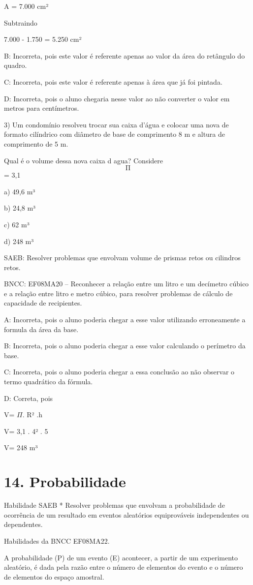 A = 7.000 cm²

Subtraindo

7.000 - 1.750 = 5.250 cm²

B: Incorreta, pois este valor é referente apenas ao valor da área do
retângulo do quadro.

C: Incorreta, pois este valor é referente apenas à área que já foi
pintada.

D: Incorreta, pois o aluno chegaria nesse valor ao não converter o valor
em metros para centímetros.

3) Um condomínio resolveu trocar sua caixa d'água e colocar uma nova de
formato cilíndrico com diâmetro de base de comprimento 8 m e altura de
comprimento de 5 m.

Qual é o volume dessa nova caixa d agua? Considere \[\text{Π}\] = 3,1

a) 49,6 m³

b) 24,8 m³

c) 62 m³

d) 248 m³

SAEB: Resolver problemas que envolvam volume de prismas retos ou
cilindros retos.

BNCC: EF08MA20 -- Reconhecer a relação entre um litro e um decímetro
cúbico e a relação entre litro e metro cúbico, para resolver problemas
de cálculo de capacidade de recipientes.

A: Incorreta, pois o aluno poderia chegar a esse valor utilizando
erroneamente a formula da área da base.

B: Incorreta, pois o aluno poderia chegar a esse valor calculando o
perímetro da base.

C: Incorreta, pois o aluno poderia chegar a essa conclusão ao não
observar o termo quadrático da fórmula.

D: Correta, pois

V= \(\Pi\). R² .h

V= 3,1 . 4² . 5

V= 248 m³


\section{14. Probabilidade}

Habilidade SAEB * Resolver problemas que envolvam a probabilidade de
ocorrência de um resultado em eventos aleatórios equiprováveis
independentes ou dependentes.

Habilidades da BNCC EF08MA22.

A probabilidade (P) de um evento (E) acontecer, a partir de um
experimento aleatório, é dada pela razão entre o número de elementos do
evento e o número de elementos do espaço amostral.

